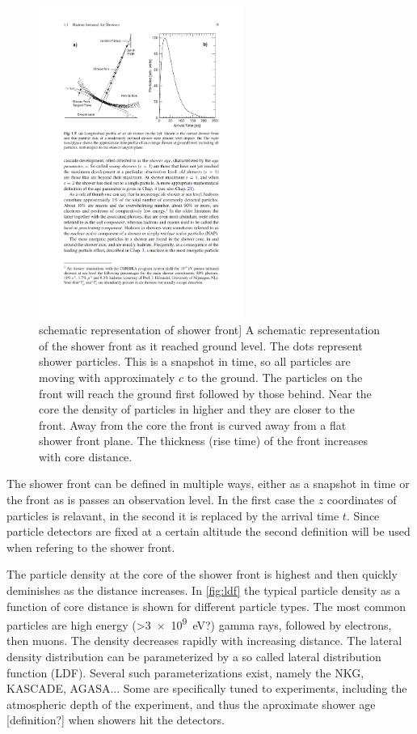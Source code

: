 \begin{figure}
    \centering
    \includegraphics[width=0.6\textwidth]
                    {plots/cosmic-rays/schematic_front}
    \caption{schematic representation of shower front]
A schematic representation of the shower front as it reached ground level. The dots represent shower particles. This is a snapshot in time, so all particles are moving with approximately $c$ to the ground. The particles on the front will reach the ground first followed by those behind. Near the core the density of particles in higher and they are closer to the front. Away from the core the front is curved away from a flat shower front plane. The thickness (rise time) of the front increases with core distance.}
    \label{fig:schematic_front}
\end{figure}

The shower front can be defined in multiple ways, either as a snapshot in time or the front as is passes an observation level. In the first case the $z$ coordinates of particles is relavant, in the second it is replaced by the arrival time $t$. Since particle detectors are fixed at a certain altitude the second definition will be used when refering to the shower front.

The particle density at the core of the shower front is highest and then quickly deminishes as the distance increases. In \cref{fig:ldf} the typical particle density as a function of core distance is shown for different particle types. The most common particles are high energy (>\SI{3e9}{\eV}?) gamma rays, followed by electrons, then muons. The density decreases rapidly with increasing distance. The lateral density distribution can be parameterized by a so called lateral distribution function (LDF). Several such parameterizations exist, namely the NKG, KASCADE, AGASA... Some are specifically tuned to experiments, including the atmospheric depth of the experiment, and thus the aproximate shower age [definition?] when showers hit the detectors.

